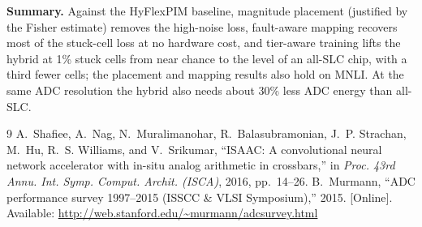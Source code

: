 \documentclass[10pt,a4paper]{article}
\begin{document}
\noindent\textbf{Summary.} Against the HyFlexPIM baseline, magnitude placement (justified by the Fisher estimate)
removes the high-noise loss, fault-aware mapping recovers most of the stuck-cell loss at no hardware cost, and
tier-aware training lifts the hybrid at 1\% stuck cells from near chance to the level of an all-SLC chip, with a
third fewer cells; the placement and mapping results also hold on MNLI. At the same ADC resolution the hybrid
also needs about 30\% less ADC energy than all-SLC.

\begin{thebibliography}{9}
 A.~Shafiee, A.~Nag, N.~Muralimanohar, R.~Balasubramonian, J.~P. Strachan, M.~Hu, R.~S. Williams,
and V.~Srikumar, ``ISAAC: A convolutional neural network accelerator with in-situ analog arithmetic in
crossbars,'' in \emph{Proc. 43rd Annu. Int. Symp. Comput. Archit. (ISCA)}, 2016, pp.~14--26.
 B.~Murmann, ``ADC performance survey 1997--2015 (ISSCC \& VLSI Symposium),'' 2015. [Online].
Available: \url{http://web.stanford.edu/~murmann/adcsurvey.html}
\end{thebibliography}

\clearpage

\end{document}
